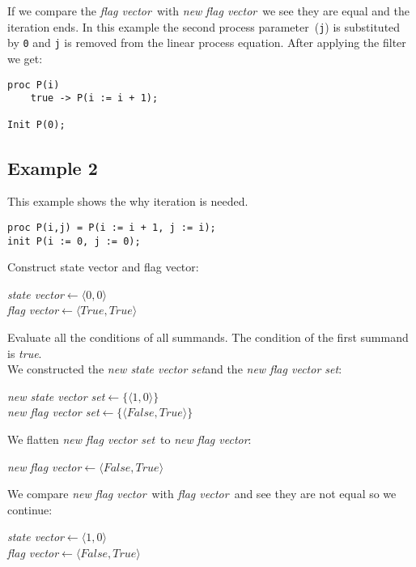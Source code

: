 \documentclass[a4paper,10pt]{article}
\newcommand{\lpe}{linear process equation}
\newcommand{\pp}{process parameter}
\newcommand{\ti}{\textit}
\newcommand{\sv}{\textit{state vector}}
\newcommand{\fv}{\textit{flag vector}}
\newcommand{\svs}{\textit{new state vector set}}
\newcommand{\fvs}{\textit{new flag vector set}}
\newcommand{\la}{$\leftarrow$}
\begin{document}
If we compare the \fv\ with \ti{new} \fv\ we see they are equal and the iteration ends.
In this example the second \pp\ (\verb"j") is substituted by \verb"0" and \verb"j" is removed from the \lpe.
After applying the filter we get:
\begin{verbatim}
proc P(i) 
	true -> P(i := i + 1);

Init P(0);
\end{verbatim}

\subsection{Example 2}
This example shows the why iteration is needed.
\begin{verbatim}
proc P(i,j) = P(i := i + 1, j := i);
init P(i := 0, j := 0); 
\end{verbatim}
 
Construct state vector and flag vector: 
\begin{center}\begin{minipage}{250pt}
\sv \la  $\langle 0 , 0 \rangle$\\
\fv \la  $\langle True , True \rangle$\\
\end{minipage}\end{center}

Evaluate all the conditions of all summands.
The condition of the first summand is \ti{true}.\\

We constructed the \svs and the \fvs :
\begin{center}\begin{minipage}{250pt}
\svs \la  $\lbrace \langle 1 , 0 \rangle \rbrace $\\
\fvs \la  $\lbrace \langle False , True \rangle \rbrace $\\
\end{minipage}\end{center}

We flatten \fvs\ to \ti{new} \fv: 
\begin{center}\begin{minipage}{250pt}
\ti{new} \fv \la $\langle False , True \rangle $
\end{minipage}\end{center}

We compare \ti{new} \fv\ with \fv\ and see they are not equal so we continue:
\begin{center}\begin{minipage}{250pt}
\sv \la $\langle 1 , 0 \rangle $\\
\fv \la $\langle False , True \rangle $\\
\end{minipage}\end{center}
\end{document}
